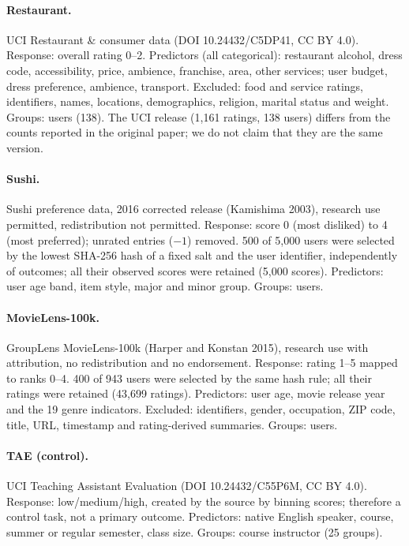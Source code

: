 \documentclass[10pt]{article}
\begin{document}
\paragraph{Restaurant.} UCI Restaurant \& consumer data (DOI 10.24432/C5DP41, CC BY 4.0). Response: overall rating 0--2. Predictors (all categorical): restaurant alcohol, dress code, accessibility, price, ambience, franchise, area, other services; user budget, dress preference, ambience, transport. Excluded: food and service ratings, identifiers, names, locations, demographics, religion, marital status and weight. Groups: users (138). The UCI release (1,161 ratings, 138 users) differs from the counts reported in the original paper; we do not claim that they are the same version.

\paragraph{Sushi.} Sushi preference data, 2016 corrected release (Kamishima 2003), research use permitted, redistribution not permitted. Response: score 0 (most disliked) to 4 (most preferred); unrated entries ($-1$) removed. 500 of 5,000 users were selected by the lowest SHA-256 hash of a fixed salt and the user identifier, independently of outcomes; all their observed scores were retained (5,000 scores). Predictors: user age band, item style, major and minor group. Groups: users.

\paragraph{MovieLens-100k.} GroupLens MovieLens-100k (Harper and Konstan 2015), research use with attribution, no redistribution and no endorsement. Response: rating 1--5 mapped to ranks 0--4. 400 of 943 users were selected by the same hash rule; all their ratings were retained (43,699 ratings). Predictors: user age, movie release year and the 19 genre indicators. Excluded: identifiers, gender, occupation, ZIP code, title, URL, timestamp and rating-derived summaries. Groups: users.

\paragraph{TAE (control).} UCI Teaching Assistant Evaluation (DOI 10.24432/C55P6M, CC BY 4.0). Response: low/medium/high, created by the source by binning scores; therefore a control task, not a primary outcome. Predictors: native English speaker, course, summer or regular semester, class size. Groups: course instructor (25 groups).
\end{document}
